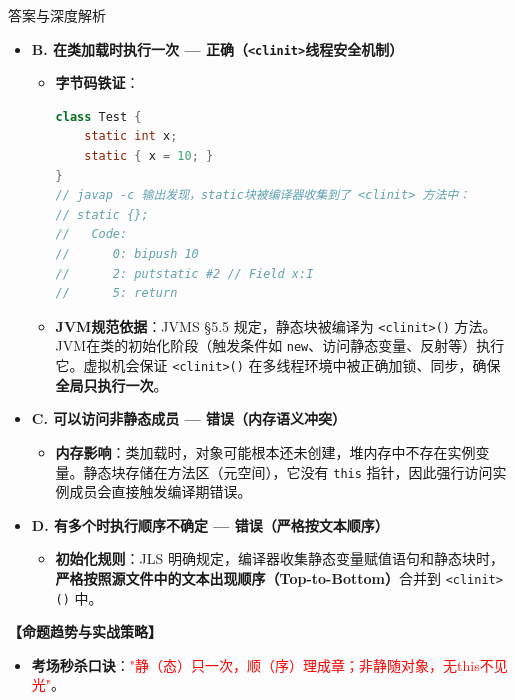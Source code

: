 \documentclass[12pt, a4paper]{ctexart}
\begin{document}
\begin{enumerate}[label=\textbf{\arabic*.}]
\begin{bluebox}{答案与深度解析}
\begin{itemize}[leftmargin=*, nosep]
			      \item \textbf{B. 在类加载时执行一次 — 正确（\texttt{<clinit>}线程安全机制）}
			            \begin{itemize}[leftmargin=*, nosep]
				            \item \textbf{字节码铁证}：
				                  \begin{lstlisting}[language=Java]
class Test {
    static int x;
    static { x = 10; }
}
// javap -c 输出发现，static块被编译器收集到了 <clinit> 方法中：
// static {};
//   Code:
//      0: bipush 10
//      2: putstatic #2 // Field x:I
//      5: return
                \end{lstlisting}
				            \item \textbf{JVM规范依据}：JVMS §5.5 规定，静态块被编译为 \texttt{<clinit>()} 方法。JVM在类的初始化阶段（触发条件如 \texttt{new}、访问静态变量、反射等）执行它。虚拟机会保证 \texttt{<clinit>()} 在多线程环境中被正确加锁、同步，确保\textbf{全局只执行一次}。
			            \end{itemize}

			      \item \textbf{C. 可以访问非静态成员 — 错误（内存语义冲突）}
			            \begin{itemize}[leftmargin=*, nosep]
				            \item \textbf{内存影响}：类加载时，对象可能根本还未创建，堆内存中不存在实例变量。静态块存储在方法区（元空间），它没有 \texttt{this} 指针，因此强行访问实例成员会直接触发编译期错误。
			            \end{itemize}

			      \item \textbf{D. 有多个时执行顺序不确定 — 错误（严格按文本顺序）}
			            \begin{itemize}[leftmargin=*, nosep]
				            \item \textbf{初始化规则}：JLS 明确规定，编译器收集静态变量赋值语句和静态块时，\textbf{严格按照源文件中的文本出现顺序（Top-to-Bottom）}合并到 \texttt{<clinit>()} 中。
			            \end{itemize}
		      \end{itemize}

		      \textbf{【命题趋势与实战策略】}
		      \begin{itemize}[leftmargin=*, nosep]
			      \item \textbf{考场秒杀口诀}：\textcolor{red}{"静（态）只一次，顺（序）理成章；非静随对象，无this不见光"}。
		      \end{itemize}
	      \end{bluebox}
\end{enumerate}
\end{document}
